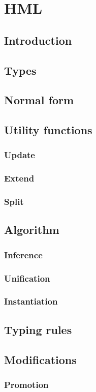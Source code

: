 \chapter{HML}
\section{Introduction}
\section{Types}
\section{Normal form}
\section{Utility functions}
\subsection{Update}
\subsection{Extend}
\subsection{Split}
\section{Algorithm}
\subsection{Inference}
\subsection{Unification}
\subsection{Instantiation}
\section{Typing rules}
\section{Modifications}
\subsection{Promotion}

